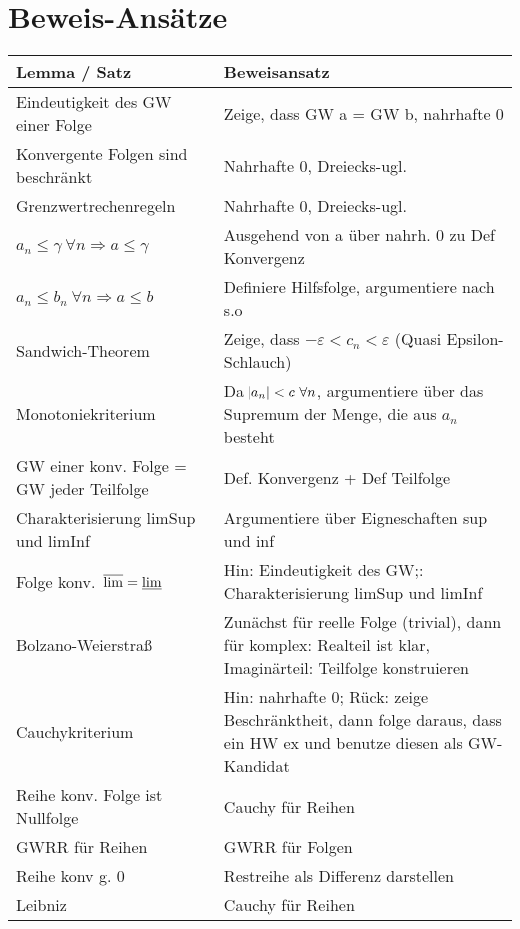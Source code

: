 \section{Beweis-Ansätze}
\begin{center}
    \begin{longtable}{lp{6cm}}
        \toprule
            Lemma / Satz & Beweisansatz\\
        \midrule
            Eindeutigkeit des GW einer Folge & Zeige, dass GW a = GW b, nahrhafte 0\\
            Konvergente Folgen sind beschränkt & Nahrhafte 0, Dreiecks-ugl.\\
            Grenzwertrechenregeln & Nahrhafte 0, Dreiecks-ugl. \\
            $a_n \leq \gamma\ \forall n \Rightarrow a \leq \gamma$  & Ausgehend von a über nahrh. 0 zu Def Konvergenz \\
            $a_n \leq b_n\ \forall n \Rightarrow a\leq b$ & Definiere Hilfsfolge, argumentiere nach s.o \\
            Sandwich-Theorem & Zeige, dass $-\varepsilon < c_n < \varepsilon$  (Quasi Epsilon-Schlauch) \\
            Monotoniekriterium & Da $\abs{a_n} < c\ \forall n$, argumentiere über das Supremum der Menge, die aus $a_n$ besteht \\
            GW einer konv. Folge = GW jeder Teilfolge & Def. Konvergenz + Def Teilfolge \\
            Charakterisierung limSup und limInf & Argumentiere über Eigneschaften sup und inf \\
            Folge konv.\ $\varlimsup = \varliminf$ & Hin: Eindeutigkeit des GW;: Charakterisierung limSup und limInf \\
            Bolzano-Weierstraß & Zunächst für reelle Folge (trivial), dann für komplex: Realteil ist klar, Imaginärteil: Teilfolge konstruieren \\
            Cauchykriterium & Hin: nahrhafte 0; Rück: zeige Beschränktheit, dann folge daraus, dass ein HW ex und benutze diesen als GW-Kandidat \\
            Reihe konv.  Folge ist Nullfolge & Cauchy für Reihen \\
            GWRR für Reihen & GWRR für Folgen \\
            Reihe konv g. 0 & Restreihe als Differenz darstellen \\
            Leibniz & Cauchy für Reihen \\

\end{longtable}
\end{center}
